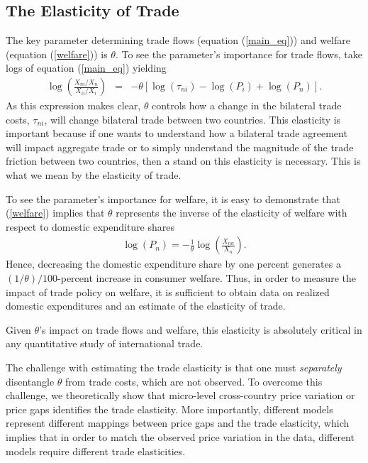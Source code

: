 \documentclass[12pt,dvips, ps2pdf]{article}
\begin{document}
\subsection{The Elasticity of Trade}\label{sec:trade_welfare}

The key parameter determining trade flows (equation (\ref{main_eq})) and welfare (equation (\ref{welfare})) is  $\theta$. To see the parameter's importance for trade flows, take logs of equation (\ref{main_eq}) yielding
\begin{eqnarray}
\displaystyle \log\left(\frac{X_{ni}/X_n}{X_{ii}/X_i}\right)&=&-\theta\left[\log\left(\tau_{ni}\right) -  \log(P_i) +  \log(P_n)\right].
\label{eq:log_elasticity_trade}
\end{eqnarray}
\noindent As this expression makes clear, $\theta$ controls how a change in the bilateral trade costs, $\tau_{ni}$, will change bilateral trade between two countries. This elasticity is important because if one wants to understand how a bilateral trade agreement will impact aggregate trade or to simply understand the magnitude of the trade friction between two countries, then a stand on this elasticity is necessary. This is what we mean by the elasticity of trade.

To see the parameter's importance for welfare, it is easy to demonstrate that (\ref{welfare}) implies that $\theta$ represents the inverse of the elasticity of welfare with respect to domestic expenditure shares
\begin{eqnarray}
\label{eq:welfare_gains}
\log(P_n)=-\frac{1}{\theta}\log\left(\frac{X_{nn}}{X_n}\right).
\end{eqnarray}
Hence, decreasing the domestic expenditure share by one percent generates a $(1/\theta)/100$-percent increase in consumer welfare. Thus, in order to measure the impact of trade policy on welfare, it is sufficient to obtain data on realized domestic expenditures and an estimate of the elasticity of trade.

Given $\theta$'s impact on trade flows and welfare, this elasticity is absolutely critical in any quantitative study of international trade.

The challenge with estimating the trade elasticity is that one must \emph{separately} disentangle $\theta$ from trade costs, which are not observed.  To overcome this challenge, we theoretically show that micro-level cross-country price variation or price gaps identifies the trade elasticity. More importantly, different models represent different mappings between price gaps and the trade elasticity, which implies that in order to match the observed price variation in the data, different models require different trade elasticities.
\end{document}
